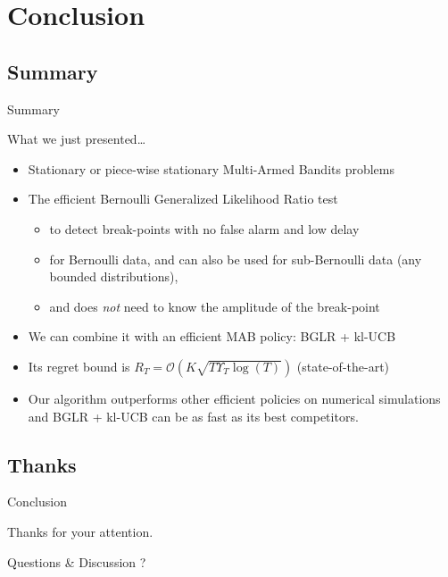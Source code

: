 \documentclass[11pt,english,ignorenonframetext,]{beamer}
\newcommand{\Fontify}{}
\providecommand{\tightlist}{%
  \setlength{\itemsep}{0pt}\setlength{\parskip}{0pt}}
\begin{document}
\section{\hfill{}Conclusion\hfill{}}
\subsection{Summary}

\begin{frame}{Summary}

  What we just presented\ldots{}
  \begin{itemize}
    \item
    Stationary or \alert{piece-wise stationary} Multi-Armed Bandits problems
    \item
    The efficient Bernoulli Generalized Likelihood Ratio test \dCooley{}
    \begin{itemize}\tightlist
      \item
      to detect break-points with \alert{no false alarm} and \alert{low delay}
      \item
      for Bernoulli data, and can also be used for sub-Bernoulli data (any bounded distributions),
      \item
      and does \emph{not} need to know the amplitude of the break-point
    \end{itemize}
    \item
    We can combine it with an efficient MAB policy:
    \alert{BGLR + kl-UCB}  \dCooley{}
    \item
    Its regret bound is $R_T = \mathcal{O}(K \sqrt{T \Upsilon_T \log(T)})$  \dCooley{} (state-of-the-art)
    \item
    Our algorithm outperforms other efficient policies on numerical simulations \dCooley\\
    and BGLR + kl-UCB can be as fast as its best competitors.
  \end{itemize}

\end{frame}

\subsection{Thanks}
\begin{frame}{Conclusion}

\begin{center}
  \begin{Large}
    {\Fontify Thanks for your attention.}
    \Innocey[1.2]
  \end{Large}
\end{center}

\vspace*{20pt}

\begin{center}
  \begin{Large}
    Questions \& Discussion ?
  \end{Large}
\end{center}

\end{frame}
\end{document}
